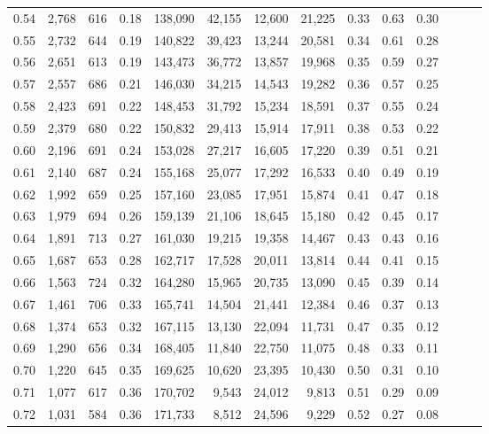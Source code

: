 \begin{tabular}{rrrrrrrrrrrrrr}
0.54 &  2,768 &  616 &  0.18 &  138,090 &   42,155 &  12,600 &  21,225 &  0.33 &  0.63 &      0.30 \\
0.55 &  2,732 &  644 &  0.19 &  140,822 &   39,423 &  13,244 &  20,581 &  0.34 &  0.61 &      0.28 \\
0.56 &  2,651 &  613 &  0.19 &  143,473 &   36,772 &  13,857 &  19,968 &  0.35 &  0.59 &      0.27 \\
0.57 &  2,557 &  686 &  0.21 &  146,030 &   34,215 &  14,543 &  19,282 &  0.36 &  0.57 &      0.25 \\
0.58 &  2,423 &  691 &  0.22 &  148,453 &   31,792 &  15,234 &  18,591 &  0.37 &  0.55 &      0.24 \\
0.59 &  2,379 &  680 &  0.22 &  150,832 &   29,413 &  15,914 &  17,911 &  0.38 &  0.53 &      0.22 \\
0.60 &  2,196 &  691 &  0.24 &  153,028 &   27,217 &  16,605 &  17,220 &  0.39 &  0.51 &      0.21 \\
0.61 &  2,140 &  687 &  0.24 &  155,168 &   25,077 &  17,292 &  16,533 &  0.40 &  0.49 &      0.19 \\
0.62 &  1,992 &  659 &  0.25 &  157,160 &   23,085 &  17,951 &  15,874 &  0.41 &  0.47 &      0.18 \\
0.63 &  1,979 &  694 &  0.26 &  159,139 &   21,106 &  18,645 &  15,180 &  0.42 &  0.45 &      0.17 \\
0.64 &  1,891 &  713 &  0.27 &  161,030 &   19,215 &  19,358 &  14,467 &  0.43 &  0.43 &      0.16 \\
0.65 &  1,687 &  653 &  0.28 &  162,717 &   17,528 &  20,011 &  13,814 &  0.44 &  0.41 &      0.15 \\
0.66 &  1,563 &  724 &  0.32 &  164,280 &   15,965 &  20,735 &  13,090 &  0.45 &  0.39 &      0.14 \\
0.67 &  1,461 &  706 &  0.33 &  165,741 &   14,504 &  21,441 &  12,384 &  0.46 &  0.37 &      0.13 \\
0.68 &  1,374 &  653 &  0.32 &  167,115 &   13,130 &  22,094 &  11,731 &  0.47 &  0.35 &      0.12 \\
0.69 &  1,290 &  656 &  0.34 &  168,405 &   11,840 &  22,750 &  11,075 &  0.48 &  0.33 &      0.11 \\
0.70 &  1,220 &  645 &  0.35 &  169,625 &   10,620 &  23,395 &  10,430 &  0.50 &  0.31 &      0.10 \\
0.71 &  1,077 &  617 &  0.36 &  170,702 &    9,543 &  24,012 &   9,813 &  0.51 &  0.29 &      0.09 \\
0.72 &  1,031 &  584 &  0.36 &  171,733 &    8,512 &  24,596 &   9,229 &  0.52 &  0.27 &      0.08 \\

\end{tabular}
